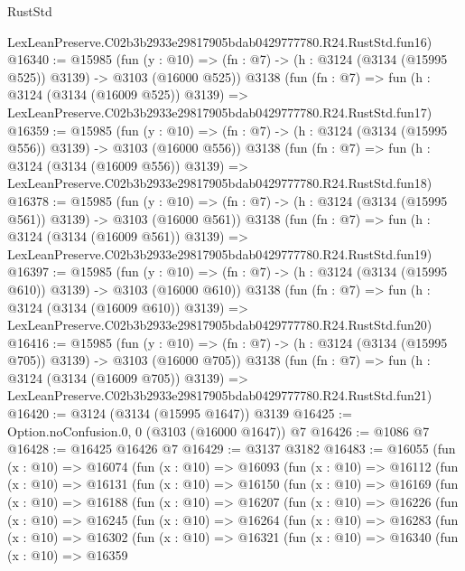 \begin{lexlean}{RustStd}
\begin{coremodule}
    LexLeanPreserve.C02b3b2933e29817905bdab0429777780.R24.RustStd.fun16)
@16340 := @15985
    (fun (y : @10) => (fn : @7) -> (h : @3124 (@3134 (@15995 @525)) @3139) -> @3103 (@16000 @525))
    @3138
    (fun (fn : @7) =>
    fun (h : @3124 (@3134 (@16009 @525)) @3139) =>
    LexLeanPreserve.C02b3b2933e29817905bdab0429777780.R24.RustStd.fun17)
@16359 := @15985
    (fun (y : @10) => (fn : @7) -> (h : @3124 (@3134 (@15995 @556)) @3139) -> @3103 (@16000 @556))
    @3138
    (fun (fn : @7) =>
    fun (h : @3124 (@3134 (@16009 @556)) @3139) =>
    LexLeanPreserve.C02b3b2933e29817905bdab0429777780.R24.RustStd.fun18)
@16378 := @15985
    (fun (y : @10) => (fn : @7) -> (h : @3124 (@3134 (@15995 @561)) @3139) -> @3103 (@16000 @561))
    @3138
    (fun (fn : @7) =>
    fun (h : @3124 (@3134 (@16009 @561)) @3139) =>
    LexLeanPreserve.C02b3b2933e29817905bdab0429777780.R24.RustStd.fun19)
@16397 := @15985
    (fun (y : @10) => (fn : @7) -> (h : @3124 (@3134 (@15995 @610)) @3139) -> @3103 (@16000 @610))
    @3138
    (fun (fn : @7) =>
    fun (h : @3124 (@3134 (@16009 @610)) @3139) =>
    LexLeanPreserve.C02b3b2933e29817905bdab0429777780.R24.RustStd.fun20)
@16416 := @15985
    (fun (y : @10) => (fn : @7) -> (h : @3124 (@3134 (@15995 @705)) @3139) -> @3103 (@16000 @705))
    @3138
    (fun (fn : @7) =>
    fun (h : @3124 (@3134 (@16009 @705)) @3139) =>
    LexLeanPreserve.C02b3b2933e29817905bdab0429777780.R24.RustStd.fun21)
@16420 := @3124 (@3134 (@15995 @1647)) @3139
@16425 := Option.noConfusion.{0, 0} (@3103 (@16000 @1647)) @7
@16426 := @1086 @7
@16428 := @16425 @16426 @7
@16429 := @3137 @3182
@16483 := @16055
    (fun (x : @10) =>
    @16074
      (fun (x : @10) =>
      @16093
        (fun (x : @10) =>
        @16112
          (fun (x : @10) =>
          @16131
            (fun (x : @10) =>
            @16150
              (fun (x : @10) =>
              @16169
                (fun (x : @10) =>
                @16188
                  (fun (x : @10) =>
                  @16207
                    (fun (x : @10) =>
                    @16226
                      (fun (x : @10) =>
                      @16245
                        (fun (x : @10) =>
                        @16264
                          (fun (x : @10) =>
                          @16283
                            (fun (x : @10) =>
                            @16302
                              (fun (x : @10) =>
                              @16321
                                (fun (x : @10) =>
                                @16340
                                  (fun (x : @10) =>
                                  @16359

\end{coremodule}
\end{lexlean}
